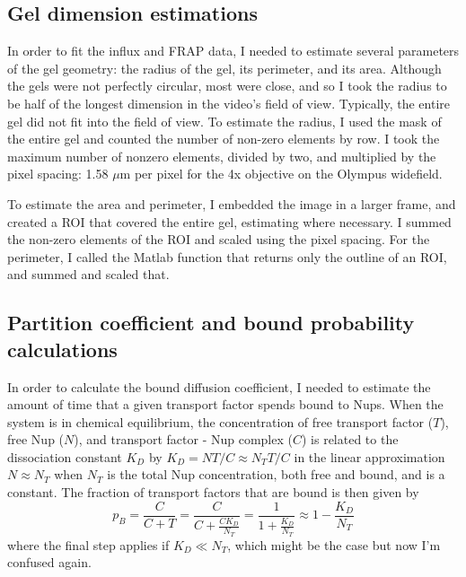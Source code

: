 \subsection{Gel dimension estimations}
In order to fit the influx and FRAP data, I needed to estimate several parameters of the gel geometry: the radius of the gel, its perimeter, and its area.  Although the gels were not perfectly circular, most were close, and so I took the radius to be half of the longest dimension in the video's field of view.  Typically, the entire gel did not fit into the field of view.   To estimate the radius, I used the mask of the entire gel and counted the number of non-zero elements by row.  I took the maximum number of nonzero elements, divided by two, and multiplied by the pixel spacing: 1.58 $\mu$m per pixel for the 4x objective on the Olympus widefield.

To estimate the area and perimeter, I embedded the image in a larger frame, and created a ROI that covered the entire gel, estimating where necessary.  I summed the non-zero elements of the ROI and scaled using the pixel spacing.  For the perimeter, I called the Matlab function that returns only the outline of an ROI, and summed and scaled that.

\subsection{Partition coefficient and bound probability calculations}
\label{sec:part-coeff}
In order to calculate the bound diffusion coefficient, I needed to estimate the amount of time that a given transport factor spends bound to Nups.  When the system is in chemical equilibrium, the concentration of free transport factor ($T$), free Nup ($N$), and transport factor - Nup complex ($C$) is related to the dissociation constant $K_D$ by
$K_D = NT/C \approx N_TT/C$ in the linear approximation $N \approx N_T$ when $N_T$ is the total Nup concentration, both free and bound, and is a constant.  The fraction of transport factors that are bound is then given by
\begin{equation}
p_B = \frac{C}{C+T} = \frac{C}{C+\frac{CK_D}{N_T}} = \frac{1}{1+\frac{K_D}{N_T}} \approx 1 - \frac{K_D}{N_T}
\label{eq:bound-prob}
\end{equation} where the final step applies if $K_D \ll N_T$, which might be the case but now I'm confused again.

